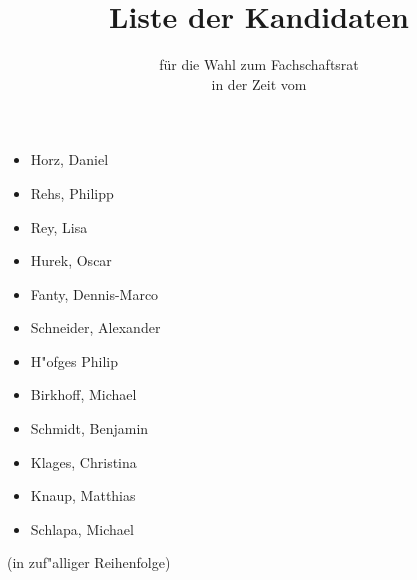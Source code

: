 

\parindent 0pt
\parskip 10pt


\title{Liste der Kandidaten}
\subtitle{für die Wahl zum Fachschaftsrat \fach \\ in der Zeit vom \zeit}
\date{}



\pagestyle{empty}
\thispagestyle{empty}
\renewcommand{\titlepagestyle}{empty}

\maketitle

\begin{center}
\Huge
\begin{itemize}
\item Horz, Daniel
\item Rehs, Philipp
\item Rey, Lisa
\item Hurek, Oscar
\item Fanty, Dennis-Marco
\item Schneider, Alexander
\item H"ofges Philip
\item Birkhoff, Michael
\item Schmidt, Benjamin
\item Klages, Christina
\item Knaup, Matthias
\item Schlapa, Michael
\end{itemize}
\huge
(in zuf"alliger Reihenfolge)
\end{center}


